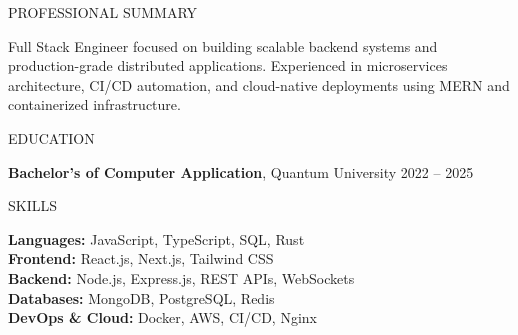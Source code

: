 \documentclass{resume}
\begin{document}

\begin{rSection}{PROFESSIONAL SUMMARY}

Full Stack Engineer focused on building scalable backend systems and production-grade distributed applications. Experienced in microservices architecture, CI/CD automation, and cloud-native deployments using MERN and containerized infrastructure.

\end{rSection}


\begin{rSection}{EDUCATION}

\textbf{Bachelor’s of Computer Application}, Quantum University \hfill 2022 -- 2025

\end{rSection}


\begin{rSection}{SKILLS}

\textbf{Languages:} JavaScript, TypeScript, SQL, Rust \\
\textbf{Frontend:} React.js, Next.js, Tailwind CSS \\
\textbf{Backend:} Node.js, Express.js, REST APIs, WebSockets \\
\textbf{Databases:} MongoDB, PostgreSQL, Redis \\
\textbf{DevOps \& Cloud:} Docker, AWS, CI/CD, Nginx

\end{rSection}

\end{document}
